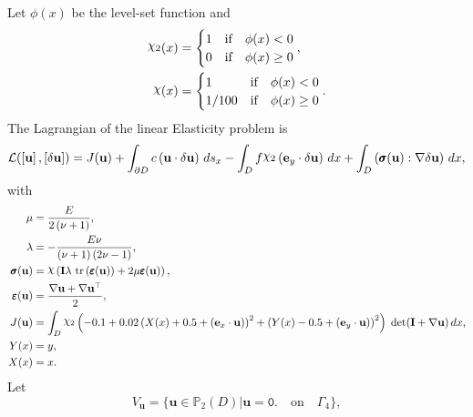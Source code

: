 \documentclass[preview]{standalone}
\let\oldcdot\cdot
\let\cdot\oldcdot
\begin{document}
Let $\phi(x)$ be the level-set function and
 \begin{align*}\raisebox{\depth}{$\chi_2$}(x) &= \begin{cases} 1 & \mbox{if}\quad \phi(x) < 0 \\ 0 & \mbox{if}\quad \phi(x)  \ge 0 \end{cases},\\
\raisebox{\depth}{$\chi$}(x) &= \begin{cases} 1 & \mbox{if}\quad \phi(x) < 0 \\ 1/100 & \mbox{if}\quad \phi(x)  \ge 0 \end{cases}.\end{align*}
The Lagrangian of the linear Elasticity problem is
\begin{dmath*}
\mathcal L(\left[ {\mathbf{ u }}\right],\left[ {\delta\mathbf{  u }}\right]) = J({\mathbf{ u }}) +  \int_{\partial D} c \left( {\mathbf{ u }} \cdot {\delta\mathbf{  u }} \right) \,ds_x -  \int_{D} f \raisebox{\depth}{$\chi_2$} \left( \mathbf e_y \cdot {\delta\mathbf{  u }} \right) \,dx +  \int_{D} \left( \pmb \sigma({\mathbf{ u }}) \mathrel{:}  \nabla {\delta\mathbf{  u }}  \right) \,dx , 
\end{dmath*}
with 
\begin{align*}
\mu &= \frac{E}{2 \left(\nu + 1\right)},\\
\lambda &= - \frac{E \nu}{\left(\nu + 1\right) \left(2 \nu - 1\right)},\\
\pmb \sigma({\mathbf{ u }}) &= \raisebox{\depth}{$\chi$} \left(\mathbf{I} \lambda  \,\operatorname{tr}\left(\pmb \varepsilon({\mathbf{ u }})\right)  + 2 \mu \pmb \varepsilon({\mathbf{ u }})\right),\\
\pmb \varepsilon({\mathbf{ u }}) &= \frac{ \nabla {\mathbf{ u }}  +   \nabla {\mathbf{ u }} ^\top }{2},\\
J({\mathbf{ u }}) &=  \int_{D} \raisebox{\depth}{$\chi_2$} \left(-0.1 + 0.02 \left(X(x) + 0.5 + \left( \mathbf e_x \cdot {\mathbf{ u }} \right)\right)^{2} + \left(Y(x) - 0.5 + \left( \mathbf e_y \cdot {\mathbf{ u }} \right)\right)^{2}\right)  \;\operatorname{det}(\mathbf{I} +  \nabla {\mathbf{ u }} )  \,dx,\\
Y(x) &= y,\\
X(x) &= x.
 \end{align*}
Let
\begin{equation*}
V_{{\mathbf{ u }}} = \{ {\mathbf{ u }} \in \mathbb P_{2}(D)| {\mathbf{ u }} = \mathtt{\text{0.}}  \quad \text{{on}} \quad\Gamma_{4} \},\end{equation*}
\end{document}
